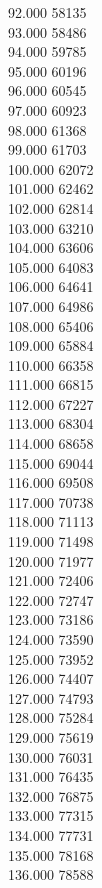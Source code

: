 { 92.000	58135 \\
 93.000	58486 \\
 94.000	59785 \\
 95.000	60196 \\
 96.000	60545 \\
 97.000	60923 \\
 98.000	61368 \\
 99.000	61703 \\
 100.000	62072 \\
 101.000	62462 \\
 102.000	62814 \\
 103.000	63210 \\
 104.000	63606 \\
 105.000	64083 \\
 106.000	64641 \\
 107.000	64986 \\
 108.000	65406 \\
 109.000	65884 \\
 110.000	66358 \\
 111.000	66815 \\
 112.000	67227 \\
 113.000	68304 \\
 114.000	68658 \\
 115.000	69044 \\
 116.000	69508 \\
 117.000	70738 \\
 118.000	71113 \\
 119.000	71498 \\
 120.000	71977 \\
 121.000	72406 \\
 122.000	72747 \\
 123.000	73186 \\
 124.000	73590 \\
 125.000	73952 \\
 126.000	74407 \\
 127.000	74793 \\
 128.000	75284 \\
 129.000	75619 \\
 130.000	76031 \\
 131.000	76435 \\
 132.000	76875 \\
 133.000	77315 \\
 134.000	77731 \\
 135.000	78168 \\
 136.000	78588 \\
}
